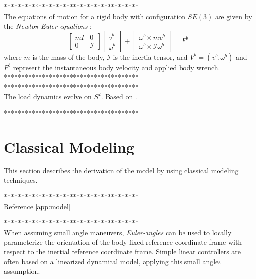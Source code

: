 ***************************************\\
The equations of motion for a rigid body with configuration $ SE(3) $ are given by the \textit{Newton-Euler equations} \cite{Murray1994}:
\begin{equation}\label{key}
\begin{bmatrix}
	mI&0\\
	0&\mathcal{I}
\end{bmatrix}
\begin{bmatrix}
	\dot{v}^b\\
	\dot{\omega}^b
\end{bmatrix}+
\begin{bmatrix}
	\omega^b\times mv^b\\
	\omega^b\times\mathcal{I}\omega^b
\end{bmatrix}=F^b
\end{equation}
where $ m $ is the mass of the body, $ \mathcal{I} $ is the inertia tensor, and $ V^b=(v^b,\omega^b) $ and $ F^b $ represent the instantaneous body velocity and applied body wrench.
***************************************\\


***************************************\\
The load dynamics evolve on $S^2 $.
Based on \cite{Lee2011}.

***************************************\\


\section{Classical Modeling}

This section describes the derivation of the model by using classical modeling techniques.

***************************************\\
Reference \ref{app:model}

***************************************\\

When assuming small angle maneuvers, \textit{Euler-angles} can be used to locally parameterize the orientation of the body-fixed reference coordinate frame with respect to the inertial reference coordinate frame. Simple linear controllers are often based on a linearized dynamical model, applying this small angles assumption. 

